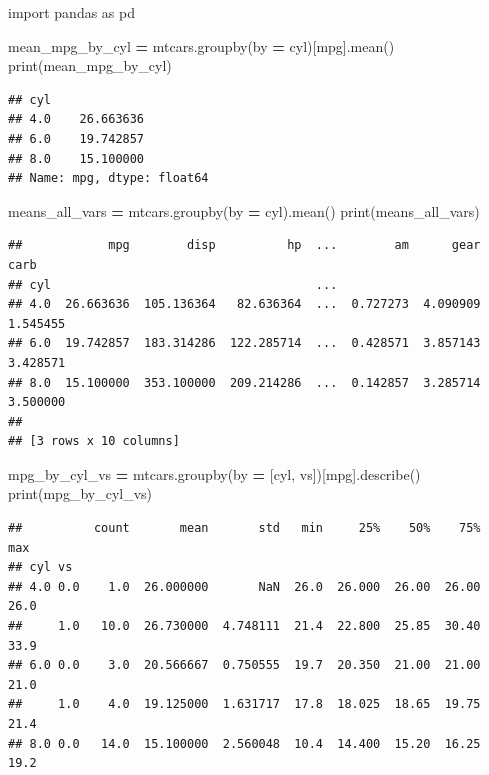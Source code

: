 \documentclass[
]{book}
\newenvironment{Shaded}{\begin{snugshade}}{\end{snugshade}}
\newcommand{\BuiltInTok}[1]{#1}
\newcommand{\ImportTok}[1]{#1}
\newcommand{\NormalTok}[1]{#1}
\newcommand{\OperatorTok}[1]{\textcolor[rgb]{0.81,0.36,0.00}{\textbf{#1}}}
\newcommand{\StringTok}[1]{\textcolor[rgb]{0.31,0.60,0.02}{#1}}
\begin{document}
\begin{Shaded}
\begin{Highlighting}[]
\ImportTok{import}\NormalTok{ pandas }\ImportTok{as}\NormalTok{ pd}

\NormalTok{mean\_mpg\_by\_cyl }\OperatorTok{=}\NormalTok{ mtcars.groupby(by }\OperatorTok{=} \StringTok{\textquotesingle{}cyl\textquotesingle{}}\NormalTok{)[}\StringTok{\textquotesingle{}mpg\textquotesingle{}}\NormalTok{].mean()}
\BuiltInTok{print}\NormalTok{(mean\_mpg\_by\_cyl)}
\end{Highlighting}
\end{Shaded}

\begin{verbatim}
## cyl
## 4.0    26.663636
## 6.0    19.742857
## 8.0    15.100000
## Name: mpg, dtype: float64
\end{verbatim}

\begin{Shaded}
\begin{Highlighting}[]
\NormalTok{means\_all\_vars }\OperatorTok{=}\NormalTok{ mtcars.groupby(by }\OperatorTok{=} \StringTok{\textquotesingle{}cyl\textquotesingle{}}\NormalTok{).mean()}
\BuiltInTok{print}\NormalTok{(means\_all\_vars)}
\end{Highlighting}
\end{Shaded}

\begin{verbatim}
##            mpg        disp          hp  ...        am      gear      carb
## cyl                                     ...                              
## 4.0  26.663636  105.136364   82.636364  ...  0.727273  4.090909  1.545455
## 6.0  19.742857  183.314286  122.285714  ...  0.428571  3.857143  3.428571
## 8.0  15.100000  353.100000  209.214286  ...  0.142857  3.285714  3.500000
## 
## [3 rows x 10 columns]
\end{verbatim}

\begin{Shaded}
\begin{Highlighting}[]
\NormalTok{mpg\_by\_cyl\_vs }\OperatorTok{=}\NormalTok{ mtcars.groupby(by }\OperatorTok{=}\NormalTok{ [}\StringTok{\textquotesingle{}cyl\textquotesingle{}}\NormalTok{, }\StringTok{\textquotesingle{}vs\textquotesingle{}}\NormalTok{])[}\StringTok{\textquotesingle{}mpg\textquotesingle{}}\NormalTok{].describe()}
\BuiltInTok{print}\NormalTok{(mpg\_by\_cyl\_vs)}
\end{Highlighting}
\end{Shaded}

\begin{verbatim}
##          count       mean       std   min     25%    50%    75%   max
## cyl vs                                                               
## 4.0 0.0    1.0  26.000000       NaN  26.0  26.000  26.00  26.00  26.0
##     1.0   10.0  26.730000  4.748111  21.4  22.800  25.85  30.40  33.9
## 6.0 0.0    3.0  20.566667  0.750555  19.7  20.350  21.00  21.00  21.0
##     1.0    4.0  19.125000  1.631717  17.8  18.025  18.65  19.75  21.4
## 8.0 0.0   14.0  15.100000  2.560048  10.4  14.400  15.20  16.25  19.2
\end{verbatim}
\end{document}
